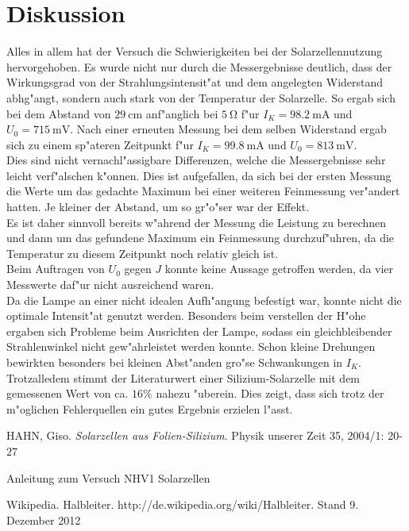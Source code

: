 \newpage
\section{Diskussion}
	\label{sec:diskussion}

	Alles in allem hat der Versuch die Schwierigkeiten bei der Solarzellennutzung hervorgehoben.
	Es wurde nicht nur durch die Messergebnisse deutlich, dass der Wirkungsgrad von der Strahlungsintensit"at und dem angelegten Widerstand abhg"angt, sondern auch stark von der Temperatur der Solarzelle.
	So ergab sich bei dem Abstand von $\SI{29}{\centi\meter}$ anf"anglich bei $\SI{5}{\ohm}$ f"ur $I_K = \SI{98.2}{\milli\ampere}$ und $U_0 = \SI{715}{\milli\volt}$.
	Nach einer erneuten Messung bei dem selben Widerstand ergab sich zu einem sp"ateren Zeitpunkt f"ur $I_K = \SI{99.8}{\milli\ampere}$ und $U_0 = \SI{813}{\milli\volt}$.\\ 
	Dies sind nicht vernachl"assigbare Differenzen, welche die Messergebnisse sehr leicht verf"alschen k"onnen.
	Dies ist aufgefallen, da sich bei der ersten Messung die Werte um das gedachte Maximum bei einer weiteren Feinmessung ver"andert hatten.
	Je kleiner der Abstand, um so gr"o"ser war der Effekt.\\
	Es ist daher sinnvoll bereits w"ahrend der Messung die Leistung zu berechnen und dann um das gefundene Maximum ein Feinmessung durchzuf"uhren, da die Temperatur zu diesem Zeitpunkt noch relativ gleich ist.\\
	Beim Auftragen von $U_0$ gegen $J$ konnte keine Aussage getroffen werden, da vier Messwerte daf"ur nicht ausreichend waren.\\
	Da die Lampe an einer nicht idealen Aufh"angung befestigt war, konnte nicht die optimale Intensit"at genutzt werden.
	Besonders beim verstellen der H"ohe ergaben sich Probleme beim Ausrichten der Lampe, sodass ein gleichbleibender Strahlenwinkel nicht gew"ahrleistet werden konnte.
	Schon kleine Drehungen bewirkten besonders bei kleinen Abst"anden gro"se Schwankungen in $I_K$.\\
	Trotzalledem stimmt der Literaturwert einer Silizium-Solarzelle  mit dem gemessenen Wert von ca. $16\%$ nahezu "uberein.
	Dies zeigt, dass sich trotz der m"oglichen Fehlerquellen ein gutes Ergebnis erzielen l"asst.

\begin{thebibliography}{9}
	 HAHN, Giso. \emph{Solarzellen aus Folien-Silizium}. Physik unserer Zeit 35, 2004/1: 20-27

	 Anleitung zum Versuch NHV1 Solarzellen

	 Wikipedia. Halbleiter. http://de.wikipedia.org/wiki/Halbleiter. Stand 9. Dezember 2012
\end{thebibliography}